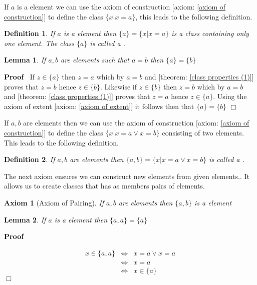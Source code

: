 \documentclass{book}
\newcommand{\nobracket}{}
\newcommand{\tmtextbf}[1]{\text{{\bfseries{#1}}}}
\newenvironment{proof}{\noindent\textbf{Proof\ }}{\hspace*{\fill}$\Box$\medskip}
\newtheorem{axiom}{Axiom}
{\theorembodyfont{\rmfamily}\newtheorem{convention}{Convention}}
\newtheorem{definition}{Definition}
{\theorembodyfont{\rmfamily}\newtheorem{example}{Example}}
\newtheorem{lemma}{Lemma}
\begin{document}
If $a$ is a element we can use the axiom of construction [axiom: \ref{axiom of
construction}] to define the class $\{ x|x = a \}$, this leads to the
following definition.

\begin{definition}
  If $a$ is a element then $\{ a \} = \{ x | x = a \nobracket \}$ is a class
  containing only one element. The class $\{ a \}$ is called a
  \tmtextbf{singleton}.
\end{definition}

\begin{lemma}
  \label{element a=b=<gtr>{a}={b}}If $a, b$ are elements such that $a = b$
  then $\{ a \} = \{ b \}$
\end{lemma}

\begin{proof}
  If $z \in \{ a \}$ then $z = a$ which by $a = b$ and [theorem: \ref{class
  properties (1)}] proves that $z = b$ hence $z \in \{ b \}$. Likewise if $z
  \in \{ b \}$ then $z = b$ which by $a = b$ and [theorem: \ref{class
  properties (1)}] proves that $z = a$ hence $z \in \{ a \}$. Using the axiom
  of extent [axiom: \ref{axiom of extent}] it follows then that $\{ a \} = \{
  b \}$
\end{proof}

If $a, b$ are elements then we can use the axiom of construction [axiom:
\ref{axiom of construction}] to define the class $\{ x | x = a \vee x = b
\nobracket \}$ consisting of two elements. This leads to the following
definition.

\begin{definition}
  If $a, b$ are elements then $\{ a, b \} = \{ x | x = a \vee x = b \nobracket
  \}$ is called a \tmtextbf{unordered pair}.
\end{definition}

The next axiom ensures we can construct new elements from given elements.. It
allows us to create classes that has as members pairs of elements.

\begin{axiom}[Axiom of Pairing]
  \label{axiom of pairing}{}If $a, b$ are elements
  then $\{ a, b \}$ is a element
\end{axiom}

\begin{lemma}
  \label{element {a,a}={a}}If $a$ is a element then $\{ a, a \} = \{ a \}$
\end{lemma}

\begin{proof}
  
  \begin{eqnarray*}
    x \in \{ a, a \} & \Leftrightarrow & x = a \vee x = a\\
    & \Leftrightarrow & x = a\\
    & \Leftrightarrow & x \in \{ a \}
  \end{eqnarray*}
\end{proof}
\end{document}
